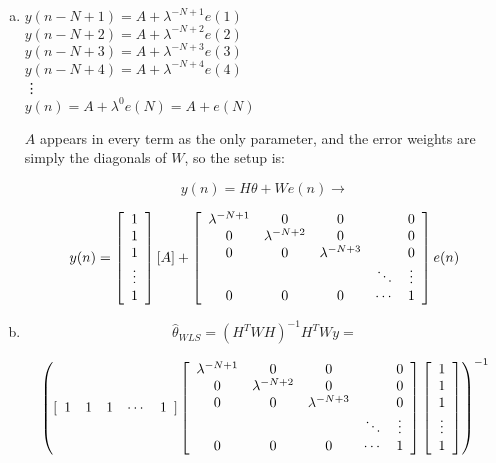 \documentclass{article}
\begin{document}
\section{}
\begin{enumerate}[(a)]
\item
$y(n-N+1) = A + \lambda^{-N+1} e(1)$\\
$y(n-N+2) = A + \lambda^{-N+2} e(2)$\\
$y(n-N+3) = A + \lambda^{-N+3} e(3)$\\
$y(n-N+4) = A + \lambda^{-N+4} e(4)$\\
\hspace{1pt} \vdots \\
$y(n) = A + \lambda^0 e(N) = A + e(N)$
\vspace{1em}

$A$ appears in every term as the only parameter, and the error weights are
simply the diagonals of $W$, so the setup is:

\[
y(n) = H\theta + We(n) \rightarrow
\]

\[
y(n) = \left[ \begin{array}{c}
1\\
1\\
1\\
\vdots\\
1\\
\end{array}\right]
[A] +
\left[ \begin{array}{c c c c c}
\lambda^{-N+1} & 0 & 0 & & 0 \\
0 & \lambda^{-N+2} & 0 & & 0 \\
0 & 0 & \lambda^{-N+3} & & 0\\
& & & \ddots & \vdots \\
0 & 0 & 0 & \cdots & 1\\
\end{array} \right] e(n)
\]

\item

\[
\hat\theta_{WLS} = (H^T W H)^{-1} H^T W y =
\]

\[
\left( [\begin{array}{c c c c c}
1 & 1 & 1 & \cdots & 1
\end{array}]
\left[ \begin{array}{c c c c c}
\lambda^{-N+1} & 0 & 0 & & 0 \\
0 & \lambda^{-N+2} & 0 & & 0 \\
0 & 0 & \lambda^{-N+3} & & 0\\
& & & \ddots & \vdots \\
0 & 0 & 0 & \cdots & 1\\
\end{array} \right]
\left[ \begin{array}{c}
1\\
1\\
1\\
\vdots\\
1\\
\end{array}\right] \right)^{-1}
\]


\end{enumerate}
\end{document}
